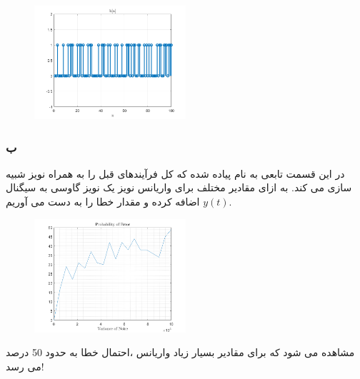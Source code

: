 \documentclass[a4paper]{article}
\begin{document}
	\begin{figure}[h!]
		\includegraphics[width=0.5\textwidth]{comsys_fig16.png}\\ 
		\centering
	\end{figure}
	\newline
	\subsubsection*{ب}
	در این قسمت تابعی به نام  پیاده شده که کل فرآیندهای قبل را به همراه نویز شبیه سازی می کند. به ازای مقادیر مختلف برای واریانس نویز یک نویز گاوسی به سیگنال 
	$y(t)$
	اضافه کرده و مقدار خطا را به دست می آوریم.
	\newline
	\begin{figure}[h!]
		\includegraphics[width=0.5\textwidth]{comsys_fig17.png}\\ 
		\centering
	\end{figure}
	\newline
	مشاهده می شود که برای مقادیر بسیار زیاد واریانس ،احتمال خطا به حدود 50 درصد می رسد!
\end{document}
